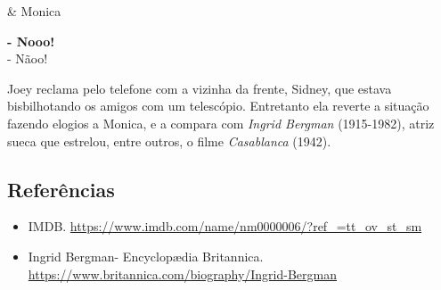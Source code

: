 \begin{tcolorbox}[enhanced,center upper,
    drop fuzzy shadow southeast, boxrule=0.3pt,
    lower separated=false, breakable,
    colframe=black!30!dialogoBorder,colback=white]
\medskip
\begin{minipage}[c]{0.16\linewidth}
   & \centering \scriptsize{Monica}
\end{minipage}
\hfill
\begin{minipage}[c]{0.8\linewidth}
  \textbf{- Nooo!}\\
  - Nãoo!
\end{minipage}
\end{tcolorbox}

Joey reclama pelo telefone com a vizinha da frente, Sidney, que estava
bisbilhotando os amigos com um telescópio. Entretanto ela reverte a
situação fazendo elogios a Monica, e a compara com \emph{Ingrid Bergman}
(1915-1982), atriz sueca que estrelou, entre outros, o filme
\emph{Casablanca} (1942).

\hypertarget{referuxeancias-5}{%
\subsection{Referências}\label{referuxeancias-5}}

\begin{itemize}
\tightlist
\item
  \sloppy IMDB. \url{https://www.imdb.com/name/nm0000006/?ref_=tt_ov_st_sm}
\item
  \sloppy Ingrid Bergman- Encyclopædia Britannica. \url{https://www.britannica.com/biography/Ingrid-Bergman}
\end{itemize}
